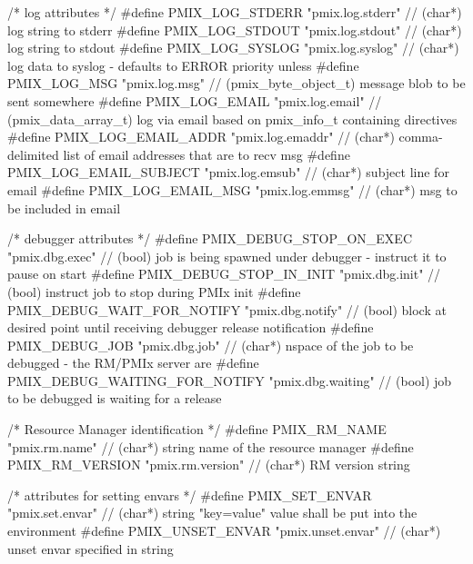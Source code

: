 \begin{codepar}
/* log attributes */
#define PMIX_LOG_STDERR                     "pmix.log.stderr"       // (char*) log string to stderr
#define PMIX_LOG_STDOUT                     "pmix.log.stdout"       // (char*) log string to stdout
#define PMIX_LOG_SYSLOG                     "pmix.log.syslog"       // (char*) log data to syslog - defaults to ERROR priority unless
#define PMIX_LOG_MSG                        "pmix.log.msg"          // (pmix_byte_object_t) message blob to be sent somewhere
#define PMIX_LOG_EMAIL                      "pmix.log.email"        // (pmix_data_array_t) log via email based on pmix_info_t containing directives
#define PMIX_LOG_EMAIL_ADDR                 "pmix.log.emaddr"       // (char*) comma-delimited list of email addresses that are to recv msg
#define PMIX_LOG_EMAIL_SUBJECT              "pmix.log.emsub"        // (char*) subject line for email
#define PMIX_LOG_EMAIL_MSG                  "pmix.log.emmsg"        // (char*) msg to be included in email

/* debugger attributes */
#define PMIX_DEBUG_STOP_ON_EXEC             "pmix.dbg.exec"         // (bool) job is being spawned under debugger - instruct it to pause on start
#define PMIX_DEBUG_STOP_IN_INIT             "pmix.dbg.init"         // (bool) instruct job to stop during PMIx init
#define PMIX_DEBUG_WAIT_FOR_NOTIFY          "pmix.dbg.notify"       // (bool) block at desired point until receiving debugger release notification
#define PMIX_DEBUG_JOB                      "pmix.dbg.job"          // (char*) nspace of the job to be debugged - the RM/PMIx server are
#define PMIX_DEBUG_WAITING_FOR_NOTIFY       "pmix.dbg.waiting"      // (bool) job to be debugged is waiting for a release

/* Resource Manager identification */
#define PMIX_RM_NAME                        "pmix.rm.name"          // (char*) string name of the resource manager
#define PMIX_RM_VERSION                     "pmix.rm.version"       // (char*) RM version string

/* attributes for setting envars */
#define PMIX_SET_ENVAR                      "pmix.set.envar"        // (char*) string "key=value" value shall be put into the environment
#define PMIX_UNSET_ENVAR                    "pmix.unset.envar"      // (char*) unset envar specified in string


\end{codepar}
